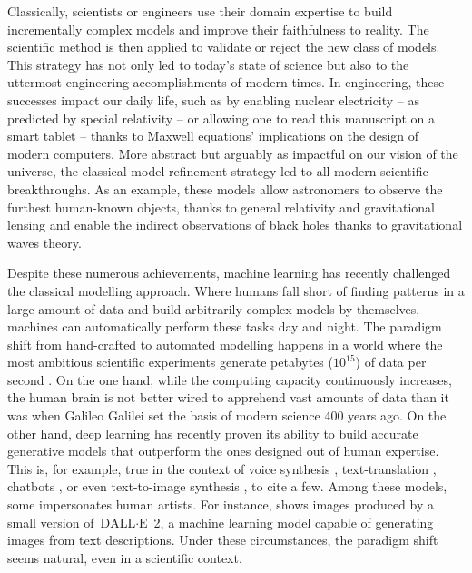 Classically, scientists or engineers use their domain expertise to build incrementally complex models and improve their faithfulness to reality. The scientific method is then applied to validate or reject the new class of models. This strategy has not only led to today's state of science but also to the uttermost engineering accomplishments of modern times. In engineering, these successes impact our daily life, such as by enabling nuclear electricity -- as predicted by special relativity -- or allowing one to read this manuscript on a smart tablet -- thanks to Maxwell equations' implications on the design of modern computers. More abstract but arguably as impactful on our vision of the universe, the classical model refinement strategy led to all modern scientific breakthroughs. As an example, these models allow astronomers to observe the furthest human-known objects, thanks to general relativity and gravitational lensing and enable the indirect observations of black holes thanks to gravitational waves theory.

Despite these numerous achievements, machine learning has recently challenged the classical modelling approach. Where humans fall short of finding patterns in a large amount of data and build arbitrarily complex models by themselves, machines can automatically perform these tasks day and night. The paradigm shift from hand-crafted to automated modelling happens in a world where the most ambitious scientific experiments generate petabytes ($10^{15}$) of data per second \citep{noauthor_cern_nodate}. On the one hand, while the computing capacity continuously increases, the human brain is not better wired to apprehend vast amounts of data than it was when Galileo Galilei set the basis of modern science 400 years ago. On the other hand, deep learning has recently proven its ability to build accurate generative models that outperform the ones designed out of human expertise. This is, for example, true in the context of voice synthesis \citep{van_den_oord_wavenet_2016}, text-translation \citep{brown2020language, devlin2018bert}, chatbots \citep{alayrac2022flamingo}, or even text-to-image synthesis \citep{ramesh2022hierarchical, saharia2022photorealistic}, to cite a few. Among these models, some impersonates human artists. For instance,  shows images produced by a small version of $\text{DALL}\cdot\text{E}$ 2, a machine learning model capable of generating images from text descriptions. Under these circumstances, the paradigm shift seems natural, even in a scientific context.


